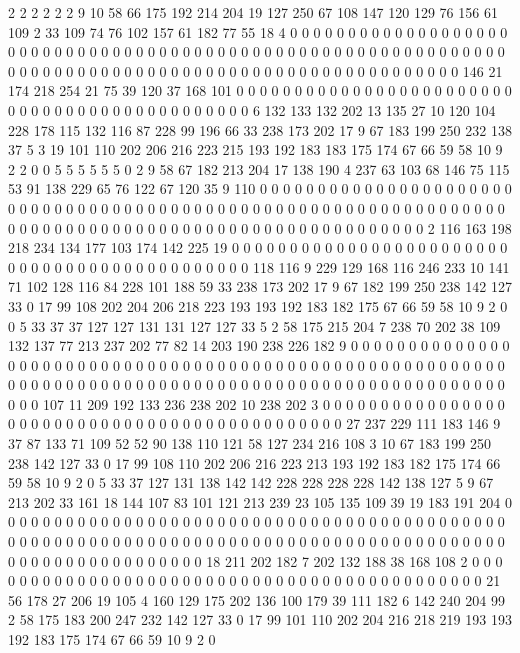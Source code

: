 2 2 2 2 2 2 9 10 58 66 175 192 214 204 19 127 250 67 108 147
120 129 76 156 61 109 2 33 109 74 76 102 157 61 182 77 55 18 4 0
0 0 0 0 0 0 0 0 0 0 0 0 0 0 0 0 0 0 0 0
0 0 0 0 0 0 0 0 0 0 0 0 0 0 0 0 0 0 0 0
0 0 0 0 0 0 0 0 0 0 0 0 0 0 0 0 0 0 0 0
0 0 0 0 0 0 0 0 0 0 0 0 0 0 0 0 0 0 0 0
0 0 0 0 0 0 0 0 0 0 0 0 0 0 0 0 0 0 0 0
146 21 174 218 254 21 75 39 120 37 168 101 0 0 0 0 0 0 0 0
0 0 0 0 0 0 0 0 0 0 0 0 0 0 0 0 0 0 0 0
0 0 0 0 0 0 0 0 0 0 0 0 0 0 0 0 0 6 132 133
132 202 13 135 27 10 120 104 228 178 115 132 116 87 228 99 196 66 33 238
173 202 17 9 67 183 199 250 232 138 37 5 3 19 101 110 202 206 216 223
215 193 192 183 183 175 174 67 66 59 58 10 9 2 2 0 0 5 5 5
5 5 5 0 2 9 58 67 182 213 204 17 138 190 4 237 63 103 68 146
75 115 53 91 138 229 65 76 122 67 120 35 9 110 0 0 0 0 0 0
0 0 0 0 0 0 0 0 0 0 0 0 0 0 0 0 0 0 0 0
0 0 0 0 0 0 0 0 0 0 0 0 0 0 0 0 0 0 0 0
0 0 0 0 0 0 0 0 0 0 0 0 0 0 0 0 0 0 0 0
0 0 0 0 0 0 0 0 0 0 0 0 0 0 0 0 0 0 0 0
0 0 0 0 0 0 0 0 0 0 0 0 0 0 0 2 116 163 198 218
234 134 177 103 174 142 225 19 0 0 0 0 0 0 0 0 0 0 0 0
0 0 0 0 0 0 0 0 0 0 0 0 0 0 0 0 0 0 0 0
0 0 0 0 0 0 0 0 0 0 0 0 0 118 116 9 229 129 168 116
246 233 10 141 71 102 128 116 84 228 101 188 59 33 238 173 202 17 9 67
182 199 250 238 142 127 33 0 17 99 108 202 204 206 218 223 193 193 192 183
182 175 67 66 59 58 10 9 2 0 0 5 33 37 37 127 127 131 131 127
127 33 5 2 58 175 215 204 7 238 70 202 38 109 132 137 77 213 237 202
77 82 14 203 190 238 226 182 9 0 0 0 0 0 0 0 0 0 0 0
0 0 0 0 0 0 0 0 0 0 0 0 0 0 0 0 0 0 0 0
0 0 0 0 0 0 0 0 0 0 0 0 0 0 0 0 0 0 0 0
0 0 0 0 0 0 0 0 0 0 0 0 0 0 0 0 0 0 0 0
0 0 0 0 0 0 0 0 0 0 0 0 0 0 0 0 0 0 0 0
0 0 0 0 0 0 0 0 0 0 0 0 107 11 209 192 133 236 238 202
10 238 202 3 0 0 0 0 0 0 0 0 0 0 0 0 0 0 0 0
0 0 0 0 0 0 0 0 0 0 0 0 0 0 0 0 0 0 0 0
0 0 0 0 0 0 0 0 0 27 237 229 111 183 146 9 37 87 133 71
109 52 52 90 138 110 121 58 127 234 216 108 3 10 67 183 199 250 238 142
127 33 0 17 99 108 110 202 206 216 223 213 193 192 183 182 175 174 66 59
58 10 9 2 0 5 33 37 127 131 138 142 142 228 228 228 228 142 138 127
5 9 67 213 202 33 161 18 144 107 83 101 121 213 239 23 105 135 109 39
19 183 191 204 0 0 0 0 0 0 0 0 0 0 0 0 0 0 0 0
0 0 0 0 0 0 0 0 0 0 0 0 0 0 0 0 0 0 0 0
0 0 0 0 0 0 0 0 0 0 0 0 0 0 0 0 0 0 0 0
0 0 0 0 0 0 0 0 0 0 0 0 0 0 0 0 0 0 0 0
0 0 0 0 0 0 0 0 0 0 0 0 0 0 0 0 0 0 0 0
0 0 0 0 0 0 0 0 18 211 202 182 7 202 132 188 38 168 108 2
0 0 0 0 0 0 0 0 0 0 0 0 0 0 0 0 0 0 0 0
0 0 0 0 0 0 0 0 0 0 0 0 0 0 0 0 0 0 0 0
0 0 0 0 21 56 178 27 206 19 105 4 160 129 175 202 136 100 179 39
111 182 6 142 240 204 99 2 58 175 183 200 247 232 142 127 33 0 17 99
101 110 202 204 216 218 219 193 193 192 183 175 174 67 66 59 10 9 2 0

